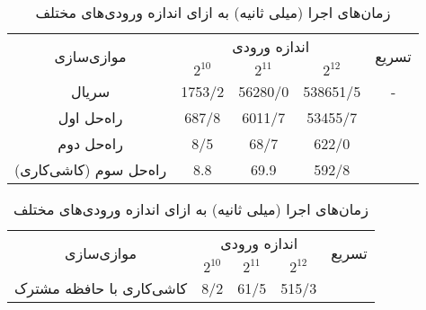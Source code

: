 \documentclass{HW}
\begin{document}
\begin{table}[ht]
\caption{زمان‌های اجرا (میلی ثانیه) به ازای اندازه ورودی‌های مختلف}
\begin{center}
\begin{tabular}{|c|c|c|c|c|}
    \hline
    \multirow{2}{*}{موازی‌سازی} & \multicolumn{3}{|c|}{اندازه ورودی}& \multirow{2}{*}{تسریع} \\
    \cline{2-4}
& $2^{10}$ & $2^{11}$ & $2^{12}$ & \\
    \hline
  سریال & 
  1753/2 & 56280/0 & 538651/5 & - \\ \hline
  
راه‌حل اول &
  687/8 & 6011/7 & 53455/7 &  \\ \hline
  
راه‌حل دوم & 
  8/5 & 68/7 & 622/0 &  \\ \hline
 
 راه‌حل سوم (کاشی‌کاری) & 
  8.8 & 69.9 & 592/8 &  \\ \hline
\end{tabular}
\end{center}
\label{tab:section2-results}
\end{table}

\begin{table}[ht]
\caption{زمان‌های اجرا (میلی ثانیه) به ازای اندازه ورودی‌های مختلف}
\begin{center}
\begin{tabular}{|c|c|c|c|c|}
    \hline
    \multirow{2}{*}{موازی‌سازی} & \multicolumn{3}{|c|}{اندازه ورودی}& \multirow{2}{*}{تسریع} \\
    \cline{2-4}
& $2^{10}$ & $2^{11}$ & $2^{12}$ & \\
    \hline
  کاشی‌کاری با حافظه مشترک & 
  8/2 & 61/5 & 515/3 &  \\ \hline

\end{tabular}
\end{center}
\label{tab:section3-results}
\end{table}



\end{document}
